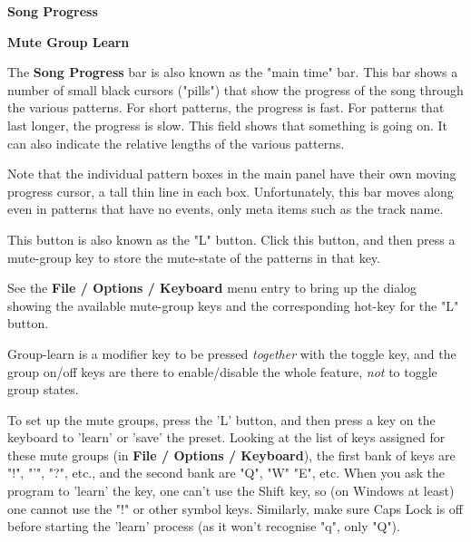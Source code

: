    \begin{enumber}
      \item \textbf{Song Progress}
      \item \textbf{Mute Group Learn}
   \end{enumber}

   \setcounter{ItemCounter}{0}      %

   The \textbf{Song Progress} bar is also known as the "main time" bar.
   This bar shows a number of small black cursors ("pills") that show the
   progress of the song through the various patterns.  For short patterns,
   the progress is fast.  For patterns that last longer, the progress is
   slow.  This field shows that something is going on.  It can also indicate
   the relative lengths of the various patterns.
 
   Note that the individual pattern boxes in the main panel have their own
   moving progress cursor, a tall thin line in each box.  Unfortunately,
   this bar moves along even in patterns that have no events, only meta
   items such as the track name.

   This button is also known as the "L" button.
   Click this button, and then press a mute-group key
   to store the mute-state of the patterns in that key.

   See the \textbf{File / Options / Keyboard} menu entry to bring up the
   dialog showing the available mute-group keys and the corresponding
   hot-key for the "L" button.

   Group-learn is a modifier key to be pressed \textsl{together}
   with the toggle key, and the group on/off keys are there to enable/disable
   the whole feature, \textsl{not} to toggle group states.

   To set up the mute groups, press the 'L' button, and then press a key on
   the keyboard to 'learn' or 'save' the preset. Looking at the list of keys
   assigned for these mute groups (in \textbf{File / Options / Keyboard}),
   the first bank of keys are "!", "'", "?", etc., and the second bank are
   "Q", "W" "E", etc.  When you ask the program to 'learn' the key, one can't
   use the Shift key, so (on Windows at least) one cannot use the "!" or
   other symbol keys.  Similarly, make sure Caps Lock is off before starting
   the 'learn' process (as it won't recognise "q", only "Q").

